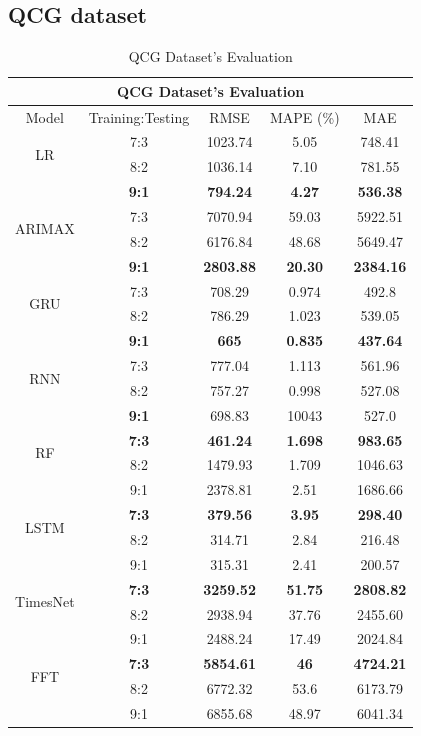 \documentclass{ieeeojies}
\begin{document}
\subsection{QCG dataset} 
\begin{table}[H]
  \centering
  \begin{tabular}{|c|c|c|c|c|}
         \hline
         \multicolumn{5}{|c|}{\textbf{QCG Dataset's Evaluation}}\\
         \hline
         \centering Model & Training:Testing & RMSE & MAPE (\%) & MAE\\
         \hline
         \multirow{2}{*}{LR} & 7:3 & 1023.74 & 5.05 & 748.41 \\ & 8:2 & 1036.14 & 7.10 & 781.55 \\ & \textbf{9:1} & \textbf{794.24} & \textbf{4.27} & \textbf{536.38}\\
         \hline
         \multirow{2}{*}{ARIMAX} & 7:3&7070.94 & 59.03 & 5922.51\\ & 8:2& 6176.84 & 48.68 & 5649.47 \\ & \textbf{9:1} & \textbf{2803.88} & \textbf{20.30} & \textbf{2384.16}\\
         \hline
         \multirow{2}{*}{GRU} & 7:3 & 708.29 & 0.974 & 492.8\\ & 8:2 & 786.29 & 1.023 & 539.05  \\ & \textbf{9:1} & \textbf{665}	& \textbf{0.835} &  \textbf{437.64} \\
         \hline
         \multirow{2}{*}{RNN} & 7:3 &  777.04 &  1.113 & 561.96 \\ & 8:2 &  757.27 & 0.998 &  527.08\\ & \textbf{9:1} & 698.83 & 10043 & 527.0\\
         \hline
         \multirow{2}{*}{RF} & \textbf{7:3}	& \textbf{461.24} & \textbf{1.698} & \textbf{983.65} \\ & 8:2 & 1479.93 & 1.709 & 1046.63 \\ & 9:1 & 2378.81 &  2.51 & 1686.66\\
         \hline
         \multirow{2}{*}{LSTM} & \textbf{7:3} & \textbf{379.56} & \textbf{3.95} & \textbf{298.40} \\ & 8:2 & 314.71 & 2.84 & 216.48 \\ & 9:1 & 315.31	&2.41&200.57\\
         \hline
         \multirow{2}{*}{TimesNet} & \textbf{7:3} & \textbf{3259.52} & \textbf{51.75} & \textbf{2808.82} \\ & 8:2 & 2938.94 & 37.76 & 2455.60 \\ & 9:1 & 2488.24	& 17.49 &2024.84\\
         \hline
         \multirow{2}{*}{FFT} & \textbf{7:3} & \textbf{5854.61} &  \textbf{46} &  \textbf{4724.21} \\ & 8:2 & 6772.32 &  53.6 &  6173.79 \\ & 9:1 & 6855.68 & 48.97 & 6041.34\\
         \hline
    \end{tabular}
    \caption{QCG Dataset's Evaluation}
    \label{vcbresult}
\end{table}
\end{document}
